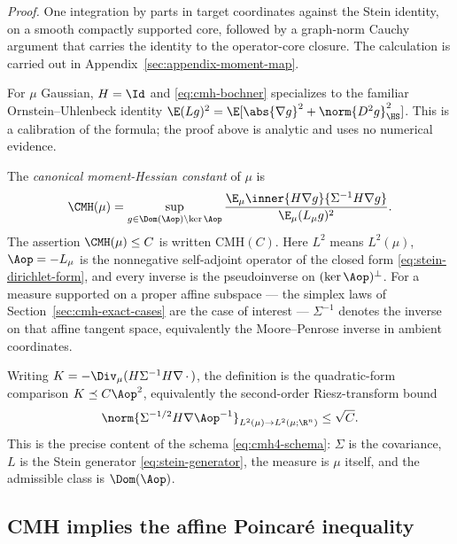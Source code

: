 \documentclass[../../main.tex]{subfiles}
\begin{document}
\noindent\emph{Proof.} One integration by parts in target coordinates against the Stein identity, on a smooth compactly supported core, followed by a graph-norm Cauchy argument that carries the identity to the operator-core closure. The calculation is carried out in Appendix~\ref{sec:appendix-moment-map}.

For $\mu$ Gaussian, $H=\Id$ and \eqref{eq:cmh-bochner} specializes to the familiar
Ornstein--Uhlenbeck identity
$\E(Lg)^2=\E[\abs{\nabla g}^2+\norm{D^2g}_{\HS}^2]$.  This is a calibration of the formula; the
proof above is analytic and uses no numerical evidence.

\begin{definition}
\label{def:cmh}
The \emph{canonical moment-Hessian constant} of $\mu$ is
\begin{equation}
  \CMH(\mu)
  =\sup_{g\in\Dom(\Aop)\setminus\ker\Aop}
   \frac{\E_\mu\inner{H\nabla g}{\Sigma^{-1}H\nabla g}}{\E_\mu(L_\mu g)^2}.
  \label{eq:cmh-constant}
\end{equation}
The assertion $\CMH(\mu)\le C$ is written $\mathrm{CMH}(C)$. Here $L^2$ means $L^2(\mu)$,
$\Aop=-L_\mu$ is the nonnegative self-adjoint operator of the closed form
\eqref{eq:stein-dirichlet-form}, and every inverse is the pseudoinverse on
$(\ker\Aop)^\perp$. For a measure supported on a proper affine subspace --- the simplex laws of
Section~\ref{sec:cmh-exact-cases} are the case of interest --- $\Sigma^{-1}$ denotes the inverse
on that affine tangent space, equivalently the Moore--Penrose inverse in ambient coordinates.
\end{definition}

Writing $K=-\Div_\mu(H\Sigma^{-1}H\nabla\,\cdot\,)$, the definition is the quadratic-form
comparison $K\preceq C\Aop^2$, equivalently the second-order Riesz-transform bound
\begin{equation}
  \norm{\Sigma^{-1/2}H\nabla\Aop^{-1}}_{L^2(\mu)\to L^2(\mu;\R^n)}\le\sqrt C.
  \label{eq:cmh-riesz}
\end{equation}
This is the precise content of the schema \eqref{eq:cmh4-schema}: $\Sigma$ is the covariance,
$L$ is the Stein generator \eqref{eq:stein-generator}, the measure is $\mu$ itself, and the
admissible class is $\Dom(\Aop)$.

\subsection{CMH implies the affine Poincar\'e inequality}
\label{subsec:cmh-implies}
\end{document}
